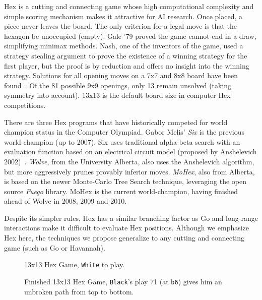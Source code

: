 \documentclass{acm_proc_article-sp}
\newcommand{\hblack}{\texttt{Black}}
\newcommand{\hwhite}{\texttt{White}}
\newcommand{\loc}[1]{\texttt{#1}}
\begin{document}
Hex is a cutting and connecting game whose high computational complexity and simple scoring mechanism makes it attractive for AI research. 
Once placed, a piece never leaves the board. 
The only criterion for a legal move is that the hexagon be unoccupied (empty). 
Gale '79 proved the game cannot end in a draw, simplifying minimax methods. 
Nash, one of the inventors of the game, used a strategy stealing argument to prove the existence of a winning strategy for the first player, but the proof is by reduction and offers no insight into the winning strategy.
Solutions for all opening moves on a 7x7 and 8x8 board have been found~\cite{henderson2009solving}. 
Of the 81 possible 9x9 openings, only 13 remain unsolved (taking symmetry into account). 13x13 is the default board size in computer Hex competitions.

There are three Hex programs that have historically competed for world champion status in the Computer Olympiad. Gabor Melis' \emph{Six} is the previous world champion (up to 2007). 
Six uses traditional alpha-beta search with an evaluation function based on an electrical circuit model (proposed by Anshelevich 2002)~\cite{anshelevich2002hierarchical}. 
\emph{Wolve}, from the University Alberta, also uses the Anshelevich algorithm, but more aggressively prunes provably inferior moves. 
\emph{MoHex}, also from Alberta, is based on the newer Monte-Carlo Tree Search technique, leveraging the open source \emph{Fuego} library. 
MoHex is the current world-champion, having finished ahead of Wolve in 2008, 2009 and 2010.

Despite its simpler rules, Hex has a similar branching factor as Go and long-range interactions make it difficult to 
evaluate Hex positions.
Although we emphasize Hex here, the techniques we propose generalize to any cutting and connecting game
(such as Go or Havannah).

\begin{figure}[tb]
	\caption{13x13 Hex Game, \hwhite{} to play.}
	\label{fig:13x13inprogress}
\end{figure}

\begin{figure}[tb]
	\caption{Finished 13x13 Hex Game, \hblack{}'s play 71 (at \loc{b6}) gives him an unbroken path from top to bottom.}
	\label{fig:13x13finished}
\end{figure}
\end{document}
